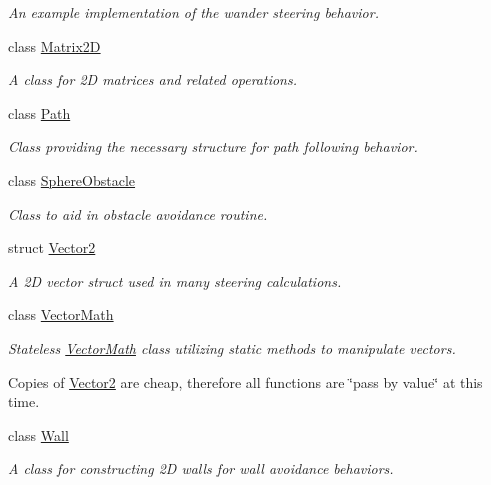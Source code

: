 \begin{DoxyCompactItemize}
\begin{DoxyCompactList}\small\item\em An example implementation of the wander steering behavior. \end{DoxyCompactList}\item 
class \hyperlink{classsteer_1_1_matrix2_d}{Matrix2\-D}
\begin{DoxyCompactList}\small\item\em A class for 2\-D matrices and related operations. \end{DoxyCompactList}\item 
class \hyperlink{classsteer_1_1_path}{Path}
\begin{DoxyCompactList}\small\item\em Class providing the necessary structure for path following behavior. \end{DoxyCompactList}\item 
class \hyperlink{classsteer_1_1_sphere_obstacle}{Sphere\-Obstacle}
\begin{DoxyCompactList}\small\item\em Class to aid in obstacle avoidance routine. \end{DoxyCompactList}\item 
struct \hyperlink{structsteer_1_1_vector2}{Vector2}
\begin{DoxyCompactList}\small\item\em A 2\-D vector struct used in many steering calculations. \end{DoxyCompactList}\item 
class \hyperlink{classsteer_1_1_vector_math}{Vector\-Math}
\begin{DoxyCompactList}\small\item\em Stateless \hyperlink{classsteer_1_1_vector_math}{Vector\-Math} class utilizing static methods to manipulate vectors. \par
Copies of \hyperlink{structsteer_1_1_vector2}{Vector2} are cheap, therefore all functions are \char`\"{}pass by value\char`\"{} at this time. \end{DoxyCompactList}\item 
class \hyperlink{classsteer_1_1_wall}{Wall}
\begin{DoxyCompactList}\small\item\em A class for constructing 2\-D walls for wall avoidance behaviors. \end{DoxyCompactList}\end{DoxyCompactItemize}
